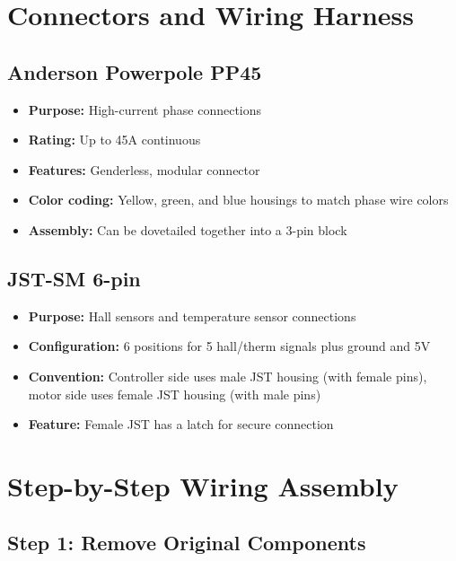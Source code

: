 \documentclass[11pt,a4paper]{article}
\begin{document}
\section{Connectors and Wiring Harness}

\subsection{Anderson Powerpole PP45}

\begin{itemize}
    \item \textbf{Purpose:} High-current phase connections
    \item \textbf{Rating:} Up to 45A continuous
    \item \textbf{Features:} Genderless, modular connector
    \item \textbf{Color coding:} Yellow, green, and blue housings to match phase wire colors
    \item \textbf{Assembly:} Can be dovetailed together into a 3-pin block
\end{itemize}

\subsection{JST-SM 6-pin}

\begin{itemize}
    \item \textbf{Purpose:} Hall sensors and temperature sensor connections
    \item \textbf{Configuration:} 6 positions for 5 hall/therm signals plus ground and 5V
    \item \textbf{Convention:} Controller side uses male JST housing (with female pins), motor side uses female JST housing (with male pins)
    \item \textbf{Feature:} Female JST has a latch for secure connection
\end{itemize}

\section{Step-by-Step Wiring Assembly}

\subsection{Step 1: Remove Original Components}
\end{document}
